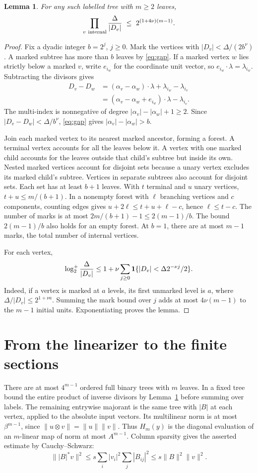 \documentclass[11pt,a4paper]{article}
\newtheorem{lemma}[theorem]{Lemma}
\begin{document}
\begin{lemma}\label{lem:tree}
For any such labelled tree with \(m\ge2\) leaves,
\[
 \prod_{v\ {\rm internal}}\frac{\Delta}{|D_v|}
 \ \le\ 2^{(1+4\nu)(m-1)} .
\]
\end{lemma}
\begin{proof}
Fix a dyadic integer \(b=2^j\), \(j\ge0\). Mark the vertices with \(|D_v|<\Delta/(2b^\nu)\). A marked subtree has more than \(b\) leaves by \eqref{eq:gap}. If a marked vertex \(w\) lies strictly below a marked \(v\), write \(e_{i_w}\) for the coordinate unit vector, so \(e_{i_w}\cdot\lambda=\lambda_{i_w}\). Subtracting the divisors gives
\[
 \begin{aligned}
 D_v-D_w&=(\alpha_v-\alpha_w)\cdot\lambda+\lambda_{i_w}-\lambda_{i_v}\\
        &=(\alpha_v-\alpha_w+e_{i_w})\cdot\lambda-\lambda_{i_v}.
 \end{aligned}
\]
The multi-index is nonnegative of degree \(|\alpha_v|-|\alpha_w|+1\ge2\). Since \(|D_v-D_w|<\Delta/b^\nu\), \eqref{eq:gap} gives \(|\alpha_v|-|\alpha_w|>b\).

Join each marked vertex to its nearest marked ancestor, forming a forest. A terminal vertex accounts for all the leaves below it. A vertex with one marked child accounts for the leaves outside that child's subtree but inside its own. Nested marked vertices account for disjoint sets because a unary vertex excludes its marked child's subtree. Vertices in separate subtrees also account for disjoint sets. Each set has at least \(b+1\) leaves. With \(t\) terminal and \(u\) unary vertices, \(t+u\le m/(b+1)\). In a nonempty forest with \(\ell\) branching vertices and \(c\) components, counting edges gives \(u+2\ell\le t+u+\ell-c\), hence \(\ell\le t-c\). The number of marks is at most \(2m/(b+1)-1\le2(m-1)/b\). The bound \(2(m-1)/b\) also holds for an empty forest. At \(b=1\), there are at most \(m-1\) marks, the total number of internal vertices.

For each vertex,
\[
 \log_2^+\frac{\Delta}{|D_v|}
 \le 1+\nu\sum_{j\ge0}{\bf1}\{|D_v|<\Delta 2^{-\nu j}/2\}.
\]
Indeed, if a vertex is marked at \(a\) levels, its first unmarked level is \(a\), where \(\Delta/|D_v|\le2^{1+\nu a}\). Summing the mark bound over \(j\) adds at most \(4\nu(m-1)\) to the \(m-1\) initial units. Exponentiating proves the lemma.
\end{proof}

\section{From the linearizer to the finite sections}
There are at most \(4^{m-1}\) ordered full binary trees with \(m\) leaves. In a fixed tree bound the entire product of inverse divisors by Lemma~\ref{lem:tree} before summing over labels. The remaining entrywise majorant is the same tree with \(|B|\) at each vertex, applied to the absolute input vectors. Its multilinear norm is at most \(\beta^{m-1}\), since \(\|u\otimes v\|=\|u\|\|v\|\). Thus \(H_m(y)\) is the diagonal evaluation of an \(m\)-linear map of norm at most \(A^{m-1}\). Column sparsity gives the asserted estimate by Cauchy--Schwarz:
\[
 \big\||B|^*v\big\|^2
 \le s\sum_i |v_i|^2\sum_j|B_{ij}|^2
 \le s\|B\|^2\|v\|^2 .
\]
\end{document}

